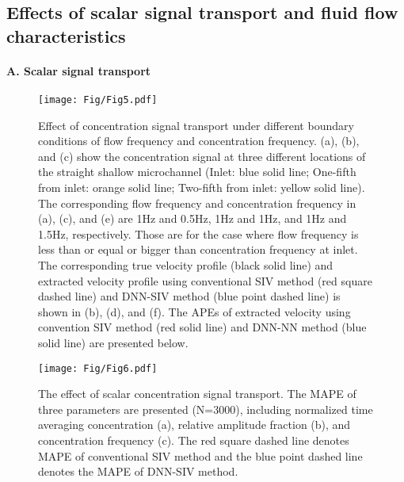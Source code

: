 \documentclass{article}
\begin{document}
\subsection{Effects of scalar signal transport and fluid flow characteristics}
\label{Sec:ScalarFLuid}
\paragraph{A. Scalar signal transport}
\begin{figure}
	\centering
	\texttt{[image: Fig/Fig5.pdf]}
	\caption{Effect of concentration signal transport under different boundary conditions of flow frequency and concentration frequency. (a), (b), and (c) show the concentration signal at three different locations of the straight shallow microchannel (Inlet: blue solid line; One-fifth from inlet: orange solid line; Two-fifth from inlet: yellow solid line). The corresponding flow frequency and concentration frequency in (a), (c), and (e) are 1Hz and 0.5Hz, 1Hz and 1Hz, and 1Hz and 1.5Hz, respectively. Those are for the case where flow frequency is less than or equal or bigger than concentration frequency at inlet. The corresponding true velocity profile (black solid line) and extracted velocity profile using conventional SIV method (red square dashed line) and DNN-SIV method (blue point dashed line) is shown in (b), (d), and (f). The APEs of extracted velocity using convention SIV method (red solid line) and DNN-NN method (blue solid line) are presented below.}
	\label{fig:fig5}
\end{figure}

\begin{figure}
	\centering
	\texttt{[image: Fig/Fig6.pdf]}
	\caption{The effect of scalar concentration signal transport. The MAPE of three parameters are presented (N=3000), including normalized time averaging concentration (a), relative amplitude fraction (b), and concentration frequency (c). The red square dashed line denotes MAPE of conventional SIV method and the blue point dashed line denotes the MAPE of DNN-SIV method.}
	\label{fig:fig6}
\end{figure}
\end{document}
